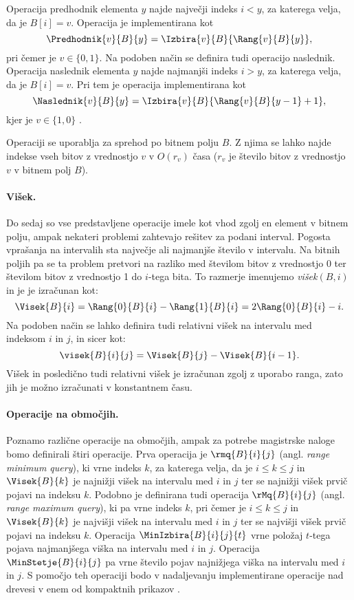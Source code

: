 Operacija predhodnik elementa $y$ najde največji indeks $i<y$, za katerega velja, da je $B[i]=v$. Operacija je implementirana kot
    $$\Predhodnik{v}{B}{y}=\Izbira{v}{B}{\Rang{v}{B}{y}},$$
pri čemer je $v\in \{0,1\}$. Na podoben način se definira tudi operacijo naslednik. Operacija naslednik elementa $y$ najde najmanjši indeks $i>y$, za katerega velja, da je $B[i]=v$. Pri tem je operacija implementirana kot
    $$\Naslednik{v}{B}{y}=\Izbira{v}{B}{\Rang{v}{B}{y-1}+1},$$
kjer je $v\in \{1,0\}$ \cite{Navarro2016}.

Operaciji se uporablja za sprehod po bitnem polju $B$. Z njima se lahko najde indekse vseh bitov z vrednostjo $v$ v $O(r_v)$ časa ($r_v$ je število bitov z vrednostjo $v$ v bitnem polj $B$).

\paragraph{Višek.}
Do sedaj so vse predstavljene operacije imele kot vhod zgolj en element v bitnem polju, ampak nekateri problemi zahtevajo rešitev za podani interval. Pogosta vprašanja na intervalih sta največje ali najmanjše število v intervalu. Na bitnih poljih pa se ta problem pretvori na razliko med številom bitov z vrednostjo 0 ter številom bitov z vrednostjo 1 do $i$-tega bita. To razmerje imenujemo \textit{višek}$(B,i)$ in je je izračunan kot:
$$
    \Visek{B}{i}=\Rang{0}{B}{i}-\Rang{1}{B}{i}=2\Rang{0}{B}{i}-i.
$$
Na podoben način se lahko definira tudi relativni višek na intervalu med indeksom $i$ in $j$, in sicer kot:
$$
    \visek{B}{i}{j}=\Visek{B}{j}-\Visek{B}{i-1}.
$$
Višek in posledično tudi relativni višek je izračunan zgolj z uporabo ranga, zato jih je možno izračunati v konstantnem času.

\paragraph{Operacije na območjih.}
Poznamo različne operacije na območjih, ampak za potrebe magistrske naloge bomo definirali štiri operacije.
Prva operacija je $\rmq{B}{i}{j}$ (angl. \textit{range minimum query}), ki vrne indeks $k$, za katerega velja, da je $i\le k\le j$ in $\Visek{B}{k}$ je najnižji višek na intervalu med $i$ in $j$ ter se najnižji višek prvič pojavi na indeksu $k$. Podobno je definirana tudi operacija $\rMq{B}{i}{j}$ (angl. \textit{range maximum query}), ki pa vrne indeks $k$, pri čemer je $i\le k\le j$ in $\Visek{B}{k}$ je najvišji višek na intervalu med $i$ in $j$ ter se najvišji višek prvič pojavi na indeksu $k$. Operacija $\MinIzbira{B}{i}{j}{t}$ vrne položaj $t$-tega pojava najmanjšega viška na intervalu med $i$ in $j$. Operacija $\MinStetje{B}{i}{j}$ pa vrne število pojav najnižjega viška na intervalu med $i$ in $j$. S pomočjo teh operaciji bodo v nadaljevanju implementirane operacije nad drevesi v enem od kompaktnih prikazov \cite{Navarro2016}.

